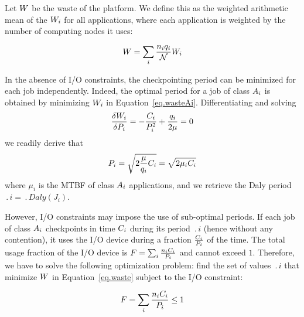 Let $W$ be the waste of the platform. We define this as the
weighted arithmetic mean of the $W_{i}$ for all applications,
where each application is weighted by the number of computing nodes
it uses:

\begin{equation}
W = \sum_i \frac{n_{i} q_{i}}{{\mathcal N}} W_{i}
\label{eq.waste}
\end{equation}

In the absence of I/O constraints, the checkpointing period can be minimized
for each job independently. Indeed, the optimal period for a job
of class $A_{i}$ is obtained by minimizing $W_{i}$ in Equation~\eqref{eq.wasteAi}.
Differentiating and solving
$$\frac{\delta W_{i}}{\delta P_{i}} = - \frac{C_{i}}{P_{i}^{2}} + \frac{q_{i}}{2 \mu} = 0$$
we readily derive that
\begin{equation}
P_{i} = \sqrt{2 \frac{\mu}{q_{i}} C_{i}} = \sqrt{2 \mu_{i} C_{i}}
\label{eq.daly}
\end{equation}
where $\mu_{i}$ is the MTBF of  class $A_{i}$ applications, and we retrieve the Daly period
$\period{i} = \period{Daly}(J_{i})$.

However, I/O constraints may impose the use of sub-optimal periods. If each job
of  class $A_{i}$ checkpoints in time $C_{i}$ during its period $\period{i}$ (hence
without any contention), it uses the I/O device during a fraction $\frac{C_{i}}{P_{i}}$ of the time.
The total usage fraction of the  I/O device is $F = \sum_{i} \frac{n_{i} C_{i}}{P_{i}}$
and cannot exceed $1$. Therefore, we have to solve the following optimization problem: find
the set of values $\period{i}$ that minimize $W$ in Equation~\eqref{eq.waste} subject to the I/O constraint:

\begin{equation}
F = \sum_{i} \frac{n_{i} C_{i}}{P_{i}} \leq 1
\label{eq.IOconstraint}
\end{equation}

